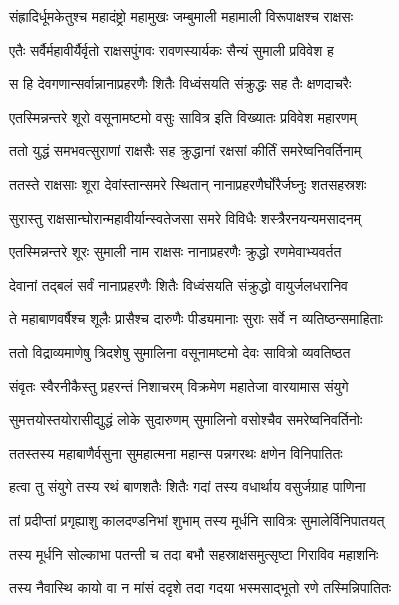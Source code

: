 \twolineshloka
{संह्रादिर्धूमकेतुश्च महादंष्ट्रो महामुखः}
{जम्बुमाली महामाली विरूपाक्षश्च राक्षसः} %

\twolineshloka
{एतैः सर्वैर्महावीर्यैर्वृतो राक्षसपुंगवः}
{रावणस्यार्यकः सैन्यं सुमाली प्रविवेश ह} %

\twolineshloka
{स हि देवगणान्सर्वान्नानाप्रहरणैः शितैः}
{विध्वंसयति संक्रुद्धः सह तैः क्षणदाचरैः} %

\twolineshloka
{एतस्मिन्नन्तरे शूरो वसूनामष्टमो वसुः}
{सावित्र इति विख्यातः प्रविवेश महारणम्} %

\twolineshloka
{ततो युद्धं समभवत्सुराणां राक्षसैः सह}
{क्रुद्धानां रक्षसां कीर्तिं समरेष्वनिवर्तिनाम्} %

\twolineshloka
{ततस्ते राक्षसाः शूरा देवांस्तान्समरे स्थितान्}
{नानाप्रहरणैर्घोरैर्जघ्नुः शतसहस्रशः} %

\twolineshloka
{सुरास्तु राक्षसान्घोरान्महावीर्यान्स्वतेजसा}
{समरे विविधैः शस्त्रैरनयन्यमसादनम्} %

\twolineshloka
{एतस्मिन्नन्तरे शूरः सुमाली नाम राक्षसः}
{नानाप्रहरणैः क्रुद्धो रणमेवाभ्यवर्तत} %

\twolineshloka
{देवानां तद्बलं सर्वं नानाप्रहरणैः शितैः}
{विध्वंसयति संक्रुद्धो वायुर्जलधरानिव} %

\twolineshloka
{ते महाबाणवर्षैश्च शूलैः प्रासैश्च दारुणैः}
{पीड्यमानाः सुराः सर्वे न व्यतिष्ठन्समाहिताः} %

\twolineshloka
{ततो विद्राव्यमाणेषु त्रिदशेषु सुमालिना}
{वसूनामष्टमो देवः सावित्रो व्यवतिष्ठत} %

\twolineshloka
{संवृतः स्वैरनीकैस्तु प्रहरन्तं निशाचरम्}
{विक्रमेण महातेजा वारयामास संयुगे} %

\twolineshloka
{सुमत्तयोस्तयोरासीद्युद्धं लोके सुदारुणम्}
{सुमालिनो वसोश्चैव समरेष्वनिवर्तिनोः} %

\twolineshloka
{ततस्तस्य महाबाणैर्वसुना सुमहात्मना}
{महान्स पन्नगरथः क्षणेन विनिपातितः} %

\twolineshloka
{हत्वा तु संयुगे तस्य रथं बाणशतैः शितैः}
{गदां तस्य वधार्थाय वसुर्जग्राह पाणिना} %

\twolineshloka
{तां प्रदीप्तां प्रगृह्याशु कालदण्डनिभां शुभाम्}
{तस्य मूर्धनि सावित्रः सुमालेर्विनिपातयत्} %

\twolineshloka
{तस्य मूर्धनि सोल्काभा पतन्ती च तदा बभौ}
{सहस्राक्षसमुत्सृष्टा गिराविव महाशनिः} %

\twolineshloka
{तस्य नैवास्थि कायो वा न मांसं ददृशे तदा}
{गदया भस्मसाद्भूतो रणे तस्मिन्निपातितः} %


